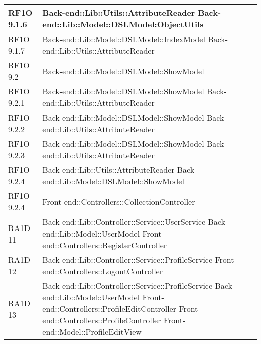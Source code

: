 \begin{center}
\begin{longtable}{ | p{3cm} | p{11cm} | }
    RF1O 9.1.6 & Back-end::Lib::Utils::AttributeReader \newline Back-end::Lib::Model::DSLModel:ObjectUtils \\ \hline      
    
    RF1O 9.1.7 & Back-end::Lib::Model::DSLModel::IndexModel \newline Back-end::Lib::Utils::AttributeReader \newline  \\ \hline
          
    RF1O 9.2 & Back-end::Lib::Model::DSLModel::ShowModel \newline  \\ \hline   
       
    RF1O 9.2.1 & Back-end::Lib::Model::DSLModel::ShowModel \newline Back-end::Lib::Utils::AttributeReader  \\ \hline       
    
    RF1O 9.2.2  & Back-end::Lib::Model::DSLModel::ShowModel \newline Back-end::Lib::Utils::AttributeReader  \\ \hline     
     
    RF1O 9.2.3 & Back-end::Lib::Model::DSLModel::ShowModel \newline Back-end::Lib::Utils::AttributeReader \\ \hline      
    
    RF1O 9.2.4 & Back-end::Lib::Utils::AttributeReader \newline Back-end::Lib::Model::DSLModel::ShowModel \\ \hline    
    
    RF1O 9.2.4 & Front-end::Controllers::CollectionController \\ \hline    
            
    RA1D 11 & Back-end::Lib::Controller::Service::UserService \newline Back-end::Lib::Model::UserModel
    \newline Front-end::Controllers::RegisterController  \\ \hline
    RA1D 12 & Back-end::Lib::Controller::Service::ProfileService \newline
    		 Front-end::Controllers::LogoutController \\ \hline
    RA1D 13 & Back-end::Lib::Controller::Service::ProfileService  \newline Back-end::Lib::Model::UserModel  \newline
    Front-end::Controllers::ProfileEditController \newline Front-end::Controllers::ProfileController \newline
    Front-end::Model::ProfileEditView \\ \hline
    

\end{longtable}
\end{center}
